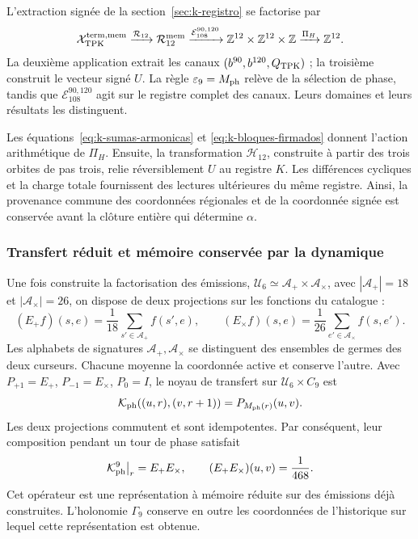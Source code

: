 L'extraction signée de la section~\ref{sec:k-registro} se factorise par
\begin{equation}
 \mathcal X_{\rm TPK}^{\rm term,mem}
 \xrightarrow{\mathcal R_{12}}\mathcal R_{12}^{\rm mem}
 \xrightarrow{\mathcal E_{108}^{90,120}}
 \mathbb Z^{12}\times\mathbb Z^{12}\times\mathbb Z
 \xrightarrow{\Pi_H}\mathbb Z^{12}.
 \label{ii:tpk-extraccion-tipada}
\end{equation}
La deuxième application extrait les canaux \((b^{90},b^{120},Q_{\rm TPK})\) ; la troisième construit le vecteur signé \(U\). La règle \(\varepsilon_9=M_{\rm ph}\) relève de la sélection de phase, tandis que \(\mathcal E_{108}^{90,120}\) agit sur le registre complet des canaux. Leurs domaines et leurs résultats les distinguent.

Les équations~\eqref{eq:k-sumas-armonicas} et \eqref{eq:k-bloques-firmados} donnent l'action arithmétique de \(\Pi_H\). Ensuite, la transformation \(\mathcal H_{12}\), construite à partir des trois orbites de pas trois, relie réversiblement \(U\) au registre \(K\). Les différences cycliques et la charge totale fournissent des lectures ultérieures du même registre. Ainsi, la provenance commune des coordonnées régionales et de la coordonnée signée est conservée avant la clôture entière qui détermine \(\alpha\).

\subsubsection{Transfert réduit et mémoire conservée par la dynamique}

Une fois construite la factorisation des émissions, \(\mathcal U_6\simeq\mathcal A_+\times\mathcal A_\times\), avec \(|\mathcal A_+|=18\) et \(|\mathcal A_\times|=26\), on dispose de deux projections sur les fonctions du catalogue :
\[
 (E_+f)(s,e)=\frac1{18}\sum_{s'\in\mathcal A_+}f(s',e),\qquad
 (E_\times f)(s,e)=\frac1{26}\sum_{e'\in\mathcal A_\times}f(s,e').
\]
Les alphabets de signatures \(\mathcal A_+,\mathcal A_\times\) se distinguent des ensembles de germes des deux curseurs. Chacune moyenne la coordonnée active et conserve l'autre. Avec \(P_{+1}=E_+\), \(P_{-1}=E_\times\), \(P_0=I\), le noyau de transfert sur \(\mathcal U_6\times C_9\) est
\[
 \mathcal K_{\rm ph}((u,r),(v,r+1))=P_{M_{\rm ph}(r)}(u,v).
\]
Les deux projections commutent et sont idempotentes. Par conséquent, leur composition pendant un tour de phase satisfait
\begin{equation}
 \mathcal K_{\rm ph}^{9}\big|_r=E_+E_\times,\qquad
 (E_+E_\times)(u,v)=\frac1{468}.
 \label{ii:tpk-renovacion}
\end{equation}
Cet opérateur est une représentation à mémoire réduite sur des émissions déjà construites. L'holonomie \(\Gamma_9\) conserve en outre les coordonnées de l'historique sur lequel cette représentation est obtenue.

